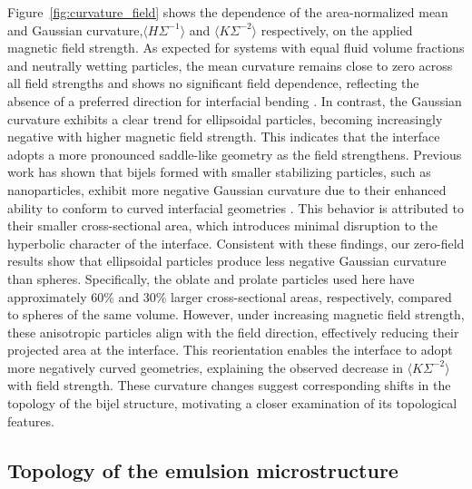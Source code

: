 Figure~\ref{fig:curvature_field} shows the dependence of the area-normalized mean and Gaussian curvature,\(\langle H \Sigma^{-1} \rangle\) and \(\langle K \Sigma^{-2} \rangle\) respectively, on the 
applied magnetic field strength. As expected for systems with equal fluid volume fractions and neutrally wetting particles, the mean curvature remains close to zero across all field strengths and shows 
no significant field dependence, reflecting the absence of a preferred direction for interfacial bending \cite{jinnai_interfacial_2001}. In contrast, the Gaussian curvature exhibits a clear trend for 
ellipsoidal particles, becoming increasingly negative with higher magnetic field strength. This indicates that the interface adopts a more pronounced saddle-like geometry as the field strengthens.
Previous work has shown that bijels formed with smaller stabilizing particles, such as nanoparticles, exhibit more negative Gaussian curvature due to their enhanced ability to conform to curved interfacial 
geometries \cite{reeves_quantitative_2016}. This behavior is attributed to their smaller cross-sectional area, which introduces minimal disruption to the hyperbolic character of the interface. Consistent 
with these findings, our zero-field results show that ellipsoidal particles produce less negative Gaussian curvature than spheres. Specifically, the oblate and prolate particles used here have approximately 
60\% and 30\% larger cross-sectional areas, respectively, compared to spheres of the same volume. However, under increasing magnetic field strength, these anisotropic particles align with the field direction, 
effectively reducing their projected area at the interface. This reorientation enables the interface to adopt more negatively curved geometries, explaining the observed decrease in 
\(\langle K \Sigma^{-2} \rangle\) with field strength. These curvature changes suggest corresponding shifts in the topology of the bijel structure, motivating a closer examination of its topological features.


\subsection{Topology of the emulsion microstructure}

